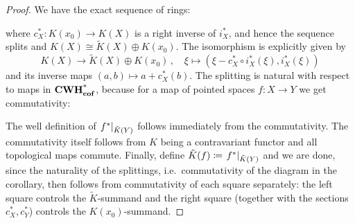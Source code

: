 \begin{proof}
	We have the exact sequence of rings:
	\begin{center}
	\end{center} where $c_X^*:K(x_0)\to K(X)$ is a right inverse of $i_X^*$, and hence the sequence splits and $K(X)\cong \tilde{K}(X)\oplus K(x_0)$. The isomorphism is explicitly given by
	\begin{equation*}
		K(X)\to \tilde{K}(X)\oplus K(x_0)\,,\quad \xi \mapsto \left(\xi- c_X^*\circ i_X^*(\xi),i_X^*(\xi)\right)
	\end{equation*} and its inverse maps $(a,b)\mapsto a+c_X^*(b)$. The splitting is natural with respect to maps in $\operatorname{\mathbf{CWH^*_{cof}}}$, because for a map of pointed spaces $f:X\to Y$ we get commutativity:
	\begin{center}\label{diag:kTheo-NaturalSplitting}
	\end{center}
	The well definition of $ \left.f^*\right|_{\tilde{K}(Y)}$ follows immediately from the commutativity. The commutativity itself follows from $K$ being a contravariant functor and all topological maps commute. Finally, define $\tilde{K}(f)\coloneq \left.f^*\right|_{\tilde{K}(Y)}$ and we are done, since  the naturality of the
splittings, i.e.\ commutativity of the diagram in the corollary, then
follows from commutativity of each square separately: the left square
controls the $\tilde{K}$-summand and the right square (together with
the sections $c_X^*, c_Y^*$) controls the $K(x_0)$-summand.
\end{proof}
